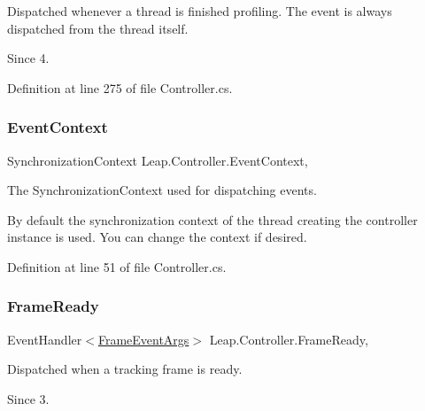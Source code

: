 Dispatched whenever a thread is finished profiling. The event is always dispatched from the thread itself. 

\begin{DoxySince}{Since}
4. 
\end{DoxySince}


Definition at line 275 of file Controller.\+cs.

\mbox{\label{class_leap_1_1_controller_afa47e4254ee6d9fa05ba485593b05e4e}} 
\subsubsection{\texorpdfstring{EventContext}{EventContext}}
{\footnotesize\ttfamily Synchronization\+Context Leap.\+Controller.\+Event\+Context\hspace{0.3cm}{\ttfamily [get]}, {\ttfamily [set]}}



The Synchronization\+Context used for dispatching events. 

By default the synchronization context of the thread creating the controller instance is used. You can change the context if desired. 

Definition at line 51 of file Controller.\+cs.

\mbox{\label{class_leap_1_1_controller_af401a79284cacb70afa71d0b109143fe}} 
\subsubsection{\texorpdfstring{FrameReady}{FrameReady}}
{\footnotesize\ttfamily Event\+Handler$<$\mbox{\hyperlink{class_leap_1_1_frame_event_args}{Frame\+Event\+Args}}$>$ Leap.\+Controller.\+Frame\+Ready\hspace{0.3cm}{\ttfamily [add]}, {\ttfamily [remove]}}



Dispatched when a tracking frame is ready. 

\begin{DoxySince}{Since}
3. 
\end{DoxySince}


